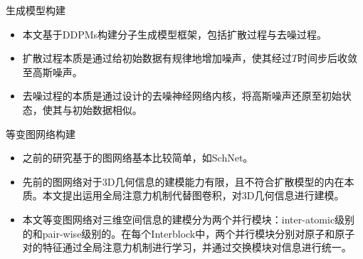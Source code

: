 \documentclass{beamer}
\begin{document}
\begin{frame}{生成模型构建}
    \begin{itemize}
        \item 本文基于DDPMs构建分子生成模型框架，包括扩散过程与去噪过程。
        \item 扩散过程本质是通过给初始数据有规律地增加噪声，使其经过$T$时间步后收敛至高斯噪声。
        \item 去噪过程的本质是通过设计的去噪神经网络内核，将高斯噪声还原至初始状态，使其与初始数据相似。
    \end{itemize}
\end{frame}

\begin{frame}{等变图网络构建}
    \begin{itemize}
        \item 之前的研究基于的图网络基本比较简单，如SchNet\cite{schnet_schutt_17}。
        \item 先前的图网络对于3D几何信息的建模能力有限，且不符合扩散模型的内在本质。本文提出运用全局注意力机制代替图卷积，对3D几何信息进行建模。
        \item 本文等变图网络对三维空间信息的建模分为两个并行模块：inter-atomic级别的和pair-wise级别的。在每个Interblock中，两个并行模块分别对原子和原子对的特征通过全局注意力机制进行学习，并通过交换模块对信息进行统一。
    \end{itemize}
\end{frame}
\end{document}
